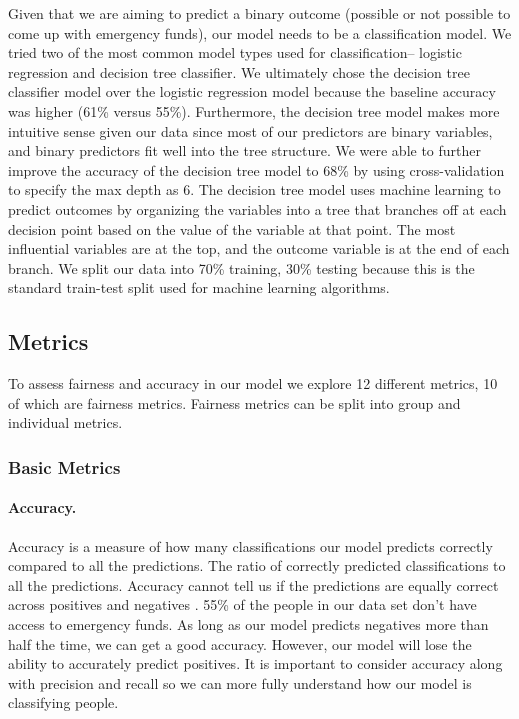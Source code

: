 \documentclass[water,article,submit,moreauthors,pdftex]{mdpi}
\begin{document}
Given that we are aiming to predict a binary outcome (possible or not
possible to come up with emergency funds), our model needs to be a
classification model. We tried two of the most common model types used
for classification-- logistic regression and decision tree classifier.
We ultimately chose the decision tree classifier model over the logistic
regression model because the baseline accuracy was higher (61\% versus
55\%). Furthermore, the decision tree model makes more intuitive sense
given our data since most of our predictors are binary variables, and
binary predictors fit well into the tree structure. We were able to
further improve the accuracy of the decision tree model to 68\% by using
cross-validation to specify the max depth as 6. The decision tree model
uses machine learning to predict outcomes by organizing the variables
into a tree that branches off at each decision point based on the value
of the variable at that point. The most influential variables are at the
top, and the outcome variable is at the end of each branch. We split our
data into 70\% training, 30\% testing because this is the standard
train-test split used for machine learning algorithms.

\hypertarget{metrics}{%
\subsection{Metrics}\label{metrics}}

To assess fairness and accuracy in our model we explore 12 different
metrics, 10 of which are fairness metrics. Fairness metrics can be split
into group and individual metrics.

\hypertarget{basic-metrics}{%
\subsubsection{Basic Metrics}\label{basic-metrics}}

\hypertarget{accuracy.}{%
\paragraph{Accuracy.}\label{accuracy.}}

Accuracy is a measure of how many classifications our model predicts
correctly compared to all the predictions. The ratio of correctly
predicted classifications to all the predictions. Accuracy cannot tell
us if the predictions are equally correct across positives and negatives
\citep{juba2019precision, gupta2021recall}. 55\% of the people in our
data set don't have access to emergency funds. As long as our model
predicts negatives more than half the time, we can get a good accuracy.
However, our model will lose the ability to accurately predict
positives. It is important to consider accuracy along with precision and
recall so we can more fully understand how our model is classifying
people.
\end{document}
